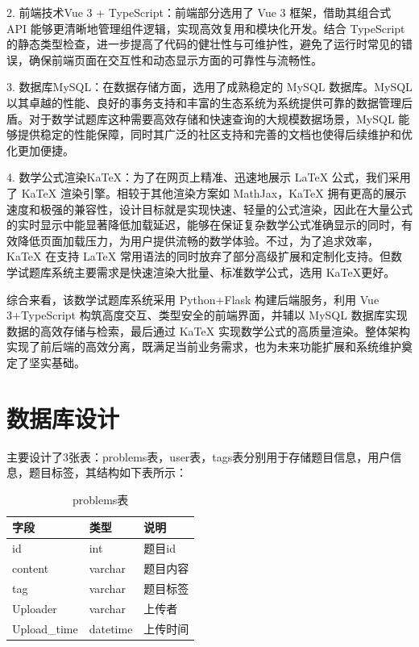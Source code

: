 \documentclass[a4paper,AutoFakeBold={2.7}]{ctexart} %
\begin{document}
2. 前端技术Vue 3 + TypeScript：前端部分选用了 Vue 3 框架，借助其组合式 API 能够更清晰地管理组件逻辑，实现高效复用和模块化开发。结合 TypeScript 的静态类型检查，进一步提高了代码的健壮性与可维护性，避免了运行时常见的错误，确保前端页面在交互性和动态显示方面的可靠性与流畅性。

3. 数据库MySQL：在数据存储方面，选用了成熟稳定的 MySQL 数据库。MySQL 以其卓越的性能、良好的事务支持和丰富的生态系统为系统提供可靠的数据管理后盾。对于数学试题库这种需要高效存储和快速查询的大规模数据场景，MySQL 能够提供稳定的性能保障，同时其广泛的社区支持和完善的文档也使得后续维护和优化更加便捷。

4. 数学公式渲染KaTeX：为了在网页上精准、迅速地展示 LaTeX 公式，我们采用了 KaTeX 渲染引擎。相较于其他渲染方案如 MathJax，KaTeX 拥有更高的展示速度和极强的兼容性，设计目标就是实现快速、轻量的公式渲染，因此在大量公式的实时显示中能显著降低加载延迟，能够在保证复杂数学公式准确显示的同时，有效降低页面加载压力，为用户提供流畅的数学体验。不过，为了追求效率，KaTeX 在支持 LaTeX 常用语法的同时放弃了部分高级扩展和定制化支持。但数学试题库系统主要需求是快速渲染大批量、标准数学公式，选用 KaTeX更好。

综合来看，该数学试题库系统采用 Python+Flask 构建后端服务，利用 Vue 3+TypeScript 构筑高度交互、类型安全的前端界面，并辅以 MySQL 数据库实现数据的高效存储与检索，最后通过 KaTeX 实现数学公式的高质量渲染。整体架构实现了前后端的高效分离，既满足当前业务需求，也为未来功能扩展和系统维护奠定了坚实基础。

\section{数据库设计}

主要设计了3张表：problems表，user表，tags表分别用于存储题目信息，用户信息，题目标签，其结构如下表所示：

\begin{table}[H]
	\caption{problems表}\label{problems表}
	\centering
	\begin{tabular}{p{3cm}<{\centering} p{3cm}<{\centering} p{3cm}<{\centering}}
		\toprule[1.5pt]
		字段&类型&说明\\
		\midrule[0.75pt]
		id&int&题目id\\
		content&varchar&题目内容\\
		tag&varchar&题目标签\\
		Uploader&varchar&上传者\\
		Upload\_time&datetime&上传时间\\
		\bottomrule[1pt]
	\end{tabular}
\end{table}
\end{document}
